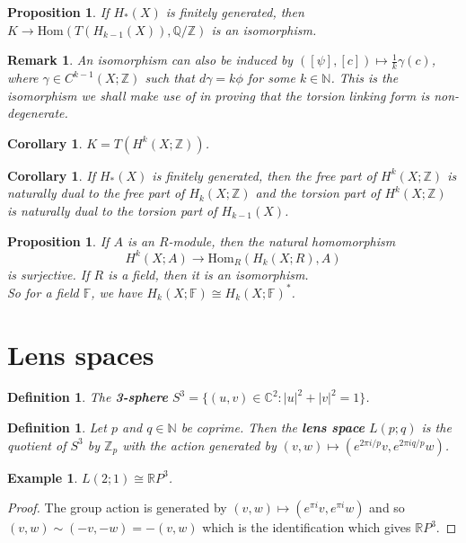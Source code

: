 \documentclass{article}
\newtheorem{definition}[theorem]{Definition}
\newtheorem{proposition}[theorem]{Proposition}
\newtheorem{corollary}[theorem]{Corollary}
\newtheorem{example}[theorem]{Example}
\newtheorem{remark}[theorem]{Remark}
\begin{document}
\begin{proposition}
If $H_*(X)$ is finitely generated, then $K\to\text{Hom}(T(H_{k-1}(X)),\mathbb{Q}/\mathbb{Z})$ is an isomorphism.
\end{proposition}

\begin{remark}
An isomorphism can also be induced by $([\psi],[c])\mapsto\frac{1}{k}\gamma(c)$, where $\gamma\in C^{k-1}(X;\mathbb{Z})$ such that $d\gamma=k\phi$ for some $k\in\mathbb{N}$. This is the isomorphism we shall make use of in proving that the torsion linking form is non-degenerate.
\end{remark}

\begin{corollary}
$K=T(H^k(X;\mathbb{Z}))$.
\end{corollary}
\begin{corollary}
If $H_*(X)$ is finitely generated, then the free part of $H^k(X;\mathbb{Z})$ is naturally dual to the free part of $H_k(X;\mathbb{Z})$ and the torsion part of $H^k(X;\mathbb{Z})$ is naturally dual to the torsion part of $H_{k-1}(X)$.
\end{corollary}

\begin{proposition}
If $A$ is an $R$-module, then the natural homomorphism\[H^k(X;A)\to\text{Hom}_R(H_k(X;R),A)\]is surjective. If $R$ is a field, then it is an isomorphism.\\
So for a field $\mathbb{F}$, we have $H_k(X;\mathbb{F})\cong H_k(X;\mathbb{F})^*$.
\end{proposition}



\section{Lens spaces}

\begin{definition}
The \textbf{3-sphere } $S^3=\{(u,v)\in\mathbb{C}^2:|u|^2+|v|^2=1\}$.
\end{definition}

\begin{definition}
Let $p$ and $q\in\mathbb{N}$ be coprime. Then the \textbf{lens space} $L(p;q)$ is the quotient of $S^3$ by $\mathbb{Z}_p$ with the action generated by $(v,w)\mapsto(e^{2\pi i/p}v,e^{2\pi iq/p}w)$.
\end{definition}

\begin{example}
$L(2;1)\cong\mathbb{R}P^3$.
\end{example}
\begin{proof}
The group action is generated by $(v,w)\mapsto(e^{\pi i}v,e^{\pi i}w)$ and so $(v,w)\sim(-v,-w)=-(v,w)$ which is the identification which gives $\mathbb{R}P^3$.
\end{proof}
\end{document}
